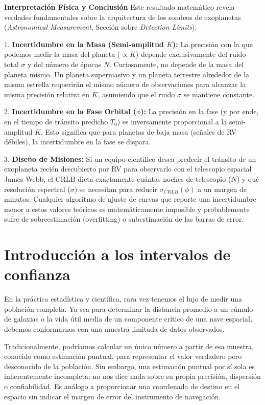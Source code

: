 \textbf{Interpretación Física y Conclusión}
Este resultado matemático revela verdades fundamentales sobre la arquitectura de los sondeos de exoplanetas (\textit{Astronomical Measurement}, Sección sobre \textit{Detection Limits}):

1. \textbf{Incertidumbre en la Masa (Semi-amplitud $K$):} La precisión con la que podemos medir la masa del planeta ($\propto K$) depende exclusivamente del ruido total $\sigma$ y del número de épocas $N$. Curiosamente, no depende de la masa del planeta mismo. Un planeta supermasivo y un planeta terrestre alrededor de la misma estrella requerirán el mismo número de observaciones para alcanzar la misma precisión relativa en $K$, asumiendo que el ruido $\sigma$ se mantiene constante.

2. \textbf{Incertidumbre en la Fase Orbital ($\phi$):} La precisión en la fase (y por ende, en el tiempo de tránsito predicho $T_0$) es inversamente proporcional a la semi-amplitud $K$. Esto significa que para planetas de baja masa (señales de RV débiles), la incertidumbre en la fase se dispara. 

3. \textbf{Diseño de Misiones:} Si un equipo científico desea predecir el tránsito de un exoplaneta recién descubierto por RV para observarlo con el telescopio espacial James Webb, el CRLB dicta exactamente cuántas noches de telescopio ($N$) y qué resolución espectral ($\sigma$) se necesitan para reducir $\sigma_{CRLB}(\phi)$ a un margen de minutos. Cualquier algoritmo de ajuste de curvas que reporte una incertidumbre menor a estos valores teóricos es matemáticamente imposible y probablemente sufre de sobreestimación (overfitting) o subestimación de las barras de error.

\section{Introducción a los intervalos de confianza}

En la práctica estadística y científica, rara vez tenemos el lujo de medir una población completa. Ya sea para determinar la distancia promedio a un cúmulo de galaxias o la vida útil media de un componente crítico de una nave espacial, debemos conformarnos con una muestra limitada de datos observados. 

Tradicionalmente, podríamos calcular un único número a partir de esa muestra, conocido como estimación puntual, para representar el valor verdadero pero desconocido de la población. Sin embargo, una estimación puntual por sí sola es inherentemente incompleta: no nos dice nada sobre su propia precisión, dispersión o confiabilidad. Es análogo a proporcionar una coordenada de destino en el espacio sin indicar el margen de error del instrumento de navegación.

